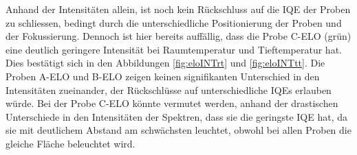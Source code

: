 \noindent 
\newline
Anhand der Intensitäten allein, ist noch kein Rückschluss auf die IQE der Proben zu schliessen, bedingt durch die unterschiedliche Positionierung der Proben und der Fokussierung. Dennoch ist hier bereits auffällig, dass die Probe C-ELO (grün) eine deutlich geringere Intensität bei Raumtemperatur und Tieftemperatur hat.
Dies bestätigt sich in den Abbildungen \ref{fig:eloINTrt} und \ref{fig:eloINTtt}.
\newline
Die Proben A-ELO und B-ELO zeigen keinen signifikanten Unterschied in den Intensitäten zueinander, der Rückschlüsse auf unterschiedliche IQEs erlauben würde. Bei der Probe C-ELO könnte vermutet werden, anhand der drastischen Unterschiede in den Intensitäten der Spektren, dass sie die geringste IQE hat, da sie mit deutlichem Abstand am schwächsten leuchtet, obwohl bei allen Proben die gleiche Fläche beleuchtet wird. 

